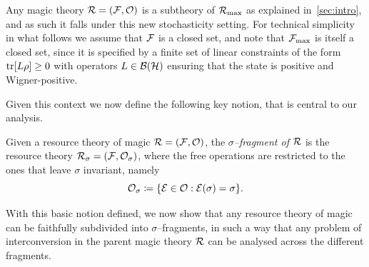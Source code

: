 \documentclass[pra,
aps,
twocolumn,
superscriptaddress,
groupedaddress,
nofootinbib,
reprint
]{revtex4-1}
\begin{document}
Any magic theory $\R = (\F, \O)$ is a subtheory of $\Rmax$ as explained in~\cref{sec:intro}, and as such it falls under this new stochasticity setting. 
For technical simplicity in what follows we assume that $\F$ is a closed set, and note that $\F_{\rm{ max}}$ is itself a closed set, since it is specified by a finite set of linear constraints of the form $\tr[ L\rho] \geq 0$ with operators $L \in \cal{B}(\cal{H})$ ensuring that the state is positive and Wigner-positive.


Given this context we now define the following key notion, that is central to our analysis.
\begin{definition}\label{def:sigmafrag}
   Given a resource theory of magic $\R = (\F, \O)$, the \emph{$\sigma$--fragment of $\R$} is the resource theory $\R_\sigma = (\F, \O_\sigma)$, where the free operations are restricted to the ones that leave $\sigma$ invariant, namely
    \begin{equation}
        \O_\sigma \coloneqq \{ \E \in \O: \E(\sigma) = \sigma \}.
    \end{equation}
\end{definition}

With this basic notion defined, we now show that any resource theory of magic can be faithfully subdivided into $\sigma$--fragments, in such a way that any problem of interconversion in the parent magic theory $\R$ can be analysed across the different fragments.
\end{document}
